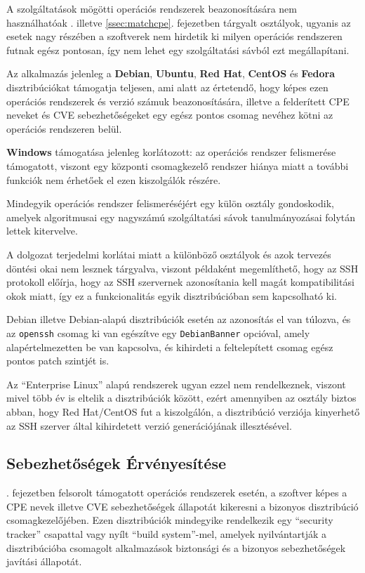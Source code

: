 	A szolgáltatások mögötti operációs rendszerek beazonosítására nem használhatóak \az{\ref{ssec:patternmatch}}. illetve \ref{ssec:matchcpe}. fejezetben tárgyalt osztályok, ugyanis az esetek nagy részében a szoftverek nem hirdetik ki milyen operációs rendszeren futnak egész pontosan, így nem lehet egy szolgáltatási sávból ezt megállapítani.
	
	Az alkalmazás jelenleg a \textbf{Debian}, \textbf{Ubuntu}, \textbf{Red Hat}, \textbf{CentOS} és \textbf{Fedora} disztribúciókat támogatja teljesen, ami alatt az értetendő, hogy képes ezen operációs rendszerek és verzió számuk beazonosítására, illetve a felderített CPE neveket és CVE sebezhetőségeket egy egész pontos csomag nevéhez kötni az operációs rendszeren belül.
	
	\textbf{Windows} támogatása jelenleg korlátozott: az operációs rendszer felismerése támogatott, viszont egy központi csomagkezelő rendszer hiánya miatt a további funkciók nem érhetőek el ezen kiszolgálók részére.
	
	Mindegyik operációs rendszer felismeréséjért egy külön osztály gondoskodik, amelyek algoritmusai egy nagyszámú szolgáltatási sávok tanulmányozásai folytán lettek kitervelve.
	
	A dolgozat terjedelmi korlátai miatt a különböző osztályok és azok tervezés döntési okai nem lesznek tárgyalva, viszont példaként megemlíthető, hogy az SSH protokoll előírja, hogy az SSH szervernek azonosítania kell magát kompatibilitási okok miatt, így ez a funkcionalitás egyik disztribúcióban sem kapcsolható ki.
	
	Debian illetve Debian-alapú disztribúciók esetén az azonosítás el van túlozva, és az \texttt{openssh} csomag ki van egészítve egy \texttt{DebianBanner} opcióval, amely alapértelmezetten be van kapcsolva, és kihirdeti a feltelepített csomag egész pontos patch szintjét is.
	
	Az ``Enterprise Linux'' alapú rendszerek ugyan ezzel nem rendelkeznek, viszont mivel több év is eltelik a disztribúciók között, ezért amennyiben az osztály biztos abban, hogy Red Hat/CentOS fut a kiszolgálón, a disztribúció verziója kinyerhető az SSH szerver által kihirdetett verzió generációjának illesztésével.

\subsection*{Sebezhetőségek Érvényesítése} \label{ssec:vulnvalid}

	\Az{\ref{ssec:opsysmatcher}}. fejezetben felsorolt támogatott operációs rendszerek esetén, a szoftver képes a CPE nevek illetve CVE sebezhetőségek állapotát kikeresni a bizonyos disztribúció csomagkezelőjében. Ezen disztribúciók mindegyike rendelkezik egy ``security tracker'' csapattal vagy nyílt ``build system''-mel, amelyek nyilvántartják a disztribúcióba csomagolt alkalmazások biztonsági és a bizonyos sebezhetőségek javítási állapotát.
	
